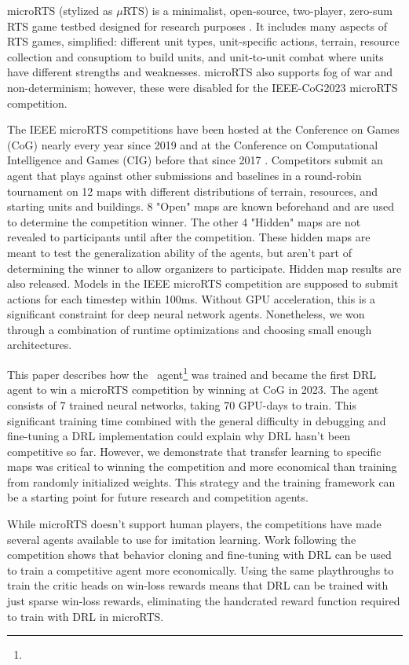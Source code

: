 \documentclass{article}
\begin{document}
microRTS (stylized as $\mu$RTS) is a minimalist, open-source, two-player, zero-sum RTS game testbed designed for research
purposes \citep{Ontan2013TheCM}. It includes many aspects of RTS games, simplified: different unit types, unit-specific
actions, terrain, resource collection and consuptiom to build units, and unit-to-unit combat
where units have different strengths and weaknesses. microRTS also supports fog of war
and non-determinism; however, these were disabled for the IEEE-CoG2023 microRTS
competition.

The IEEE microRTS competitions have been hosted at the Conference on Games (CoG) nearly
every year since 2019 and at the Conference on Computational Intelligence and Games
(CIG) before that since 2017 \citep{Ontañón_Barriga_Silva_Moraes_Lelis_2018}.
Competitors submit an agent that plays against other submissions and baselines in a round-robin tournament
on 12 maps with different distributions of terrain, resources, and starting units and
buildings. 8 "Open" maps are known beforehand and are used to determine the competition winner.
The other 4 "Hidden" maps are not revealed to participants until after the competition.
These hidden maps are meant to test the generalization ability of the agents, but aren't
part of determining the winner to allow organizers to participate. Hidden map results are also
released. Models in the IEEE microRTS competition are supposed to submit actions for each timestep
within 100ms. Without GPU acceleration, this is a significant constraint for deep neural
network agents. Nonetheless, we won through a combination of runtime optimizations and choosing
small enough architectures.

This paper describes how the \agentName\ agent\footnote{\raiMicroRTSGitHubUrl} was
trained and became the first DRL agent to win a microRTS competition by winning at CoG
in 2023. The agent consists of 7 trained neural networks, taking 70
GPU-days to train. This significant training time combined with the general difficulty
in debugging and fine-tuning a DRL implementation could explain why DRL hasn't been
competitive so far. However, we demonstrate that transfer learning to specific maps was
critical to winning the competition and more economical than training from randomly
initialized weights. This strategy and the training framework can be a starting
point for future research and competition agents.

While microRTS doesn't support human players, the competitions have made several agents
available to use for imitation learning. Work following the
competition shows that behavior cloning and fine-tuning with DRL can be used to train a
competitive agent more economically. Using the same playthroughs to train the critic
heads on win-loss rewards means that DRL can be trained with just sparse win-loss
rewards, eliminating the handcrated reward function required to train with DRL in microRTS.
\end{document}
